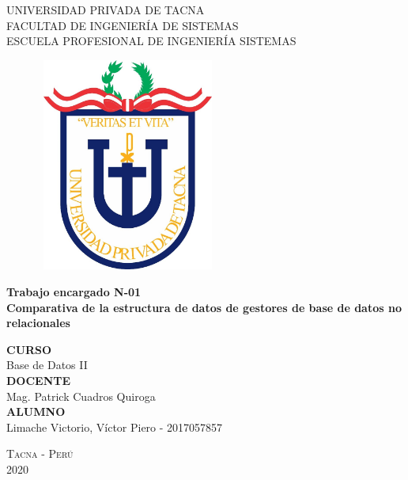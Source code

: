 \documentclass[12pt,a4paper,oneside]{book}
\begin{document}
	
	\thispagestyle{empty} 
	
	\begin{center} 
		\LARGE{UNIVERSIDAD PRIVADA DE TACNA} \\[0.5cm] 
		\Large{FACULTAD DE INGENIER\'IA DE SISTEMAS}\\[0.5cm] 
		\large{ ESCUELA PROFESIONAL DE INGENIER\'IA SISTEMAS} 
	\end{center}
	
	\begin{figure}[htb]
		\centering \includegraphics[width=6cm, height=7cm]{img/uptlogo.jpg}
	\end{figure}
	
	\begin{center} 
		\LARGE{\bf Trabajo encargado N-01 }\\
		\LARGE{\bf Comparativa de la estructura de datos de gestores de base de datos no relacionales }\\ \vspace{.25cm}
		
	\end{center}
	
	\begin{center} 
		
		\textbf {CURSO}\\ 
		\large Base de Datos II \\
		
		\textbf {DOCENTE}\\
		\large Mag. Patrick Cuadros Quiroga\\
		
		\textbf {ALUMNO}\\
		\large Limache Victorio, V\'ictor Piero - 2017057857 \\
		
	\end{center}
	
	\begin{center} 
		\Large \textsc{Tacna - Perú} \\
		\Large \textsc{2020 } 
	\end{center}
	
\end{document}
